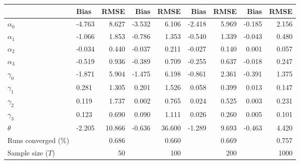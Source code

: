 
\begin{tabular}[t]{llrrrrrrr}
\toprule
  & Bias & RMSE & Bias & RMSE & Bias & RMSE & Bias & RMSE\\
\midrule
$\alpha_{0}$ & -4.763 & 8.627 & -3.532 & 6.106 & -2.418 & 5.969 & -0.185 & 2.156\\
$\alpha_{1}$ & -1.066 & 1.853 & -0.786 & 1.353 & -0.540 & 1.339 & -0.043 & 0.480\\
$\alpha_{2}$ & -0.034 & 0.440 & -0.037 & 0.211 & -0.027 & 0.140 & 0.001 & 0.057\\
$\alpha_{3}$ & -0.519 & 0.936 & -0.389 & 0.709 & -0.255 & 0.637 & -0.018 & 0.247\\
$\gamma_{0}$ & -1.871 & 5.904 & -1.475 & 6.198 & -0.861 & 2.361 & -0.391 & 1.375\\
$\gamma_{1}$ & 0.281 & 1.305 & 0.201 & 1.526 & 0.058 & 0.399 & 0.013 & 0.147\\
$\gamma_{2}$ & 0.119 & 1.737 & 0.002 & 0.765 & 0.024 & 0.525 & 0.003 & 0.231\\
$\gamma_{3}$ & 0.123 & 0.690 & 0.090 & 1.111 & 0.026 & 0.260 & 0.005 & 0.101\\
$\theta$ & -2.205 & 10.866 & -0.636 & 36.600 & -1.289 & 9.693 & -0.463 & 4.420\\
Runs converged (\%) &  & 0.686 &  & 0.660 &  & 0.669 &  & 0.757\\
Sample size ($T$) &  & 50 &  & 100 &  & 200 &  & 1000\\
\bottomrule
\end{tabular}

